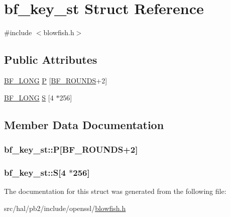 \hypertarget{structbf__key__st}{}\section{bf\+\_\+key\+\_\+st Struct Reference}
\label{structbf__key__st}


{\ttfamily \#include $<$blowfish.\+h$>$}

\subsection*{Public Attributes}
\begin{DoxyCompactItemize}
\item 
\hyperlink{blowfish_8h_a10d45274394a4cb51d39209f66754558}{B\+F\+\_\+\+L\+O\+NG} \hyperlink{structbf__key__st_ab3d902f934c73304feaa3989267dd49e}{P} \mbox{[}\hyperlink{blowfish_8h_aaf74c725458f1e04e450aac4456b01a5}{B\+F\+\_\+\+R\+O\+U\+N\+DS}+2\mbox{]}
\item 
\hyperlink{blowfish_8h_a10d45274394a4cb51d39209f66754558}{B\+F\+\_\+\+L\+O\+NG} \hyperlink{structbf__key__st_ace6847124ec6775c49ea44b13598f8a9}{S} \mbox{[}4 $\ast$256\mbox{]}
\end{DoxyCompactItemize}


\subsection{Member Data Documentation}
\subsubsection[{\texorpdfstring{P}{P}}]{ bf\+\_\+key\+\_\+st\+::P\mbox{[}{\bf B\+F\+\_\+\+R\+O\+U\+N\+DS}+2\mbox{]}}\hypertarget{structbf__key__st_ab3d902f934c73304feaa3989267dd49e}{}\label{structbf__key__st_ab3d902f934c73304feaa3989267dd49e}
\subsubsection[{\texorpdfstring{S}{S}}]{ bf\+\_\+key\+\_\+st\+::S\mbox{[}4 $\ast$256\mbox{]}}\hypertarget{structbf__key__st_ace6847124ec6775c49ea44b13598f8a9}{}\label{structbf__key__st_ace6847124ec6775c49ea44b13598f8a9}


The documentation for this struct was generated from the following file\+:\begin{DoxyCompactItemize}
\item 
src/hal/pb2/include/openssl/\hyperlink{blowfish_8h}{blowfish.\+h}\end{DoxyCompactItemize}
